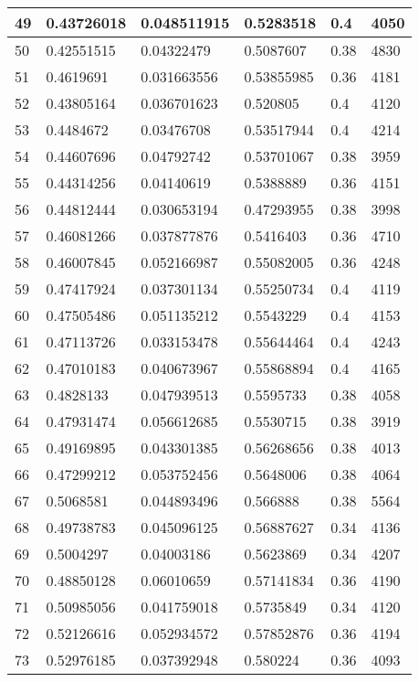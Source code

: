 \begin{longtable}{|l|l|l|l|l|l|}
49 & 0.43726018 & 0.048511915 & 0.5283518 & 0.4 & 4050 \\ \hline 
50 & 0.42551515 & 0.04322479 & 0.5087607 & 0.38 & 4830 \\ \hline 
51 & 0.4619691 & 0.031663556 & 0.53855985 & 0.36 & 4181 \\ \hline 
52 & 0.43805164 & 0.036701623 & 0.520805 & 0.4 & 4120 \\ \hline 
53 & 0.4484672 & 0.03476708 & 0.53517944 & 0.4 & 4214 \\ \hline 
54 & 0.44607696 & 0.04792742 & 0.53701067 & 0.38 & 3959 \\ \hline 
55 & 0.44314256 & 0.04140619 & 0.5388889 & 0.36 & 4151 \\ \hline 
56 & 0.44812444 & 0.030653194 & 0.47293955 & 0.38 & 3998 \\ \hline 
57 & 0.46081266 & 0.037877876 & 0.5416403 & 0.36 & 4710 \\ \hline 
58 & 0.46007845 & 0.052166987 & 0.55082005 & 0.36 & 4248 \\ \hline 
59 & 0.47417924 & 0.037301134 & 0.55250734 & 0.4 & 4119 \\ \hline 
60 & 0.47505486 & 0.051135212 & 0.5543229 & 0.4 & 4153 \\ \hline 
61 & 0.47113726 & 0.033153478 & 0.55644464 & 0.4 & 4243 \\ \hline 
62 & 0.47010183 & 0.040673967 & 0.55868894 & 0.4 & 4165 \\ \hline 
63 & 0.4828133 & 0.047939513 & 0.5595733 & 0.38 & 4058 \\ \hline 
64 & 0.47931474 & 0.056612685 & 0.5530715 & 0.38 & 3919 \\ \hline 
65 & 0.49169895 & 0.043301385 & 0.56268656 & 0.38 & 4013 \\ \hline 
66 & 0.47299212 & 0.053752456 & 0.5648006 & 0.38 & 4064 \\ \hline 
67 & 0.5068581 & 0.044893496 & 0.566888 & 0.38 & 5564 \\ \hline 
68 & 0.49738783 & 0.045096125 & 0.56887627 & 0.34 & 4136 \\ \hline 
69 & 0.5004297 & 0.04003186 & 0.5623869 & 0.34 & 4207 \\ \hline 
70 & 0.48850128 & 0.06010659 & 0.57141834 & 0.36 & 4190 \\ \hline 
71 & 0.50985056 & 0.041759018 & 0.5735849 & 0.34 & 4120 \\ \hline 
72 & 0.52126616 & 0.052934572 & 0.57852876 & 0.36 & 4194 \\ \hline 
73 & 0.52976185 & 0.037392948 & 0.580224 & 0.36 & 4093 \\ \hline 

\end{longtable}
